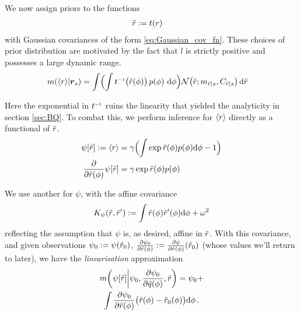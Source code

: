 \documentclass{article}
\begin{document}
We now assign \gpb priors to the functions
\begin{align*}
 \tr & \deq  t(r)
\end{align*}
with Gaussian
covariances of the form \eqref{eq:Gaussian_cov_fn}.
These choices of prior distribution are motivated by the fact that
$l$ is strictly positive and possesses a large dynamic
range. 
%
%
\begin{align}
\mean{\inty{r}}{\vr_s}
&  =\int \Bigl( \int t\inv\bigr(\tr(\phi)\bigl)\,\po{\phi}\,\ud\phi\Bigr)
\N{\tr}{\meancondfn{\tr}{s}}{\covcondfn{\tr}{s}} \ud \tr \nonumber
\end{align}

Here the exponential in $t\inv$ ruins the linearity that yielded the analyticity in section \ref{sec:BQ}. To combat this, we perform inference for $\inty{r}$ directly as a functional of $\tr$.
%
\begin{align*}
 \psi[\tr] \deq \inty{r} & = \gamma\Bigl(\int  \exp \tr(\phi) p(\phi) \ud \phi-1\Bigr)\\
\pderiv{}{\tr(\phi)}\psi[\tr] & = \gamma \exp \tr(\phi) p(\phi)
\end{align*}

We use another \gpb for $\psi$, with the affine covariance
\begin{equation*}
 K_\psi(\tr,\tr')
\deq
\int\tr(\phi) \tr'(\phi) \ud \phi
+ \omega^2
\end{equation*}
reflecting the assumption that $\psi$ is, as desired, affine in $\tr$. With this covariance, and given observations
$\psi_0 \deq \psi(\tr_0)$, $\pderiv{\psi_0}{\tr(\phi)} \deq \pderiv{\psi}{\tr(\phi)}(\tr_0)$ (whose values we'll return to later), we have the \emph{linearisation} approximation
\begin{multline}\label{eq:linearisation}
\novmean{\psi[\tr]}{\psi_0,\pderiv{\psi_0}{\tq(\phi)}, \tr} 
= \psi_0+\\
\int \pderiv{\psi_0}{\tr(\phi)}\bigl(\tr(\phi)-\tr_0(\phi)\bigr)\ud\phi\,.
\end{multline}
\end{document}
